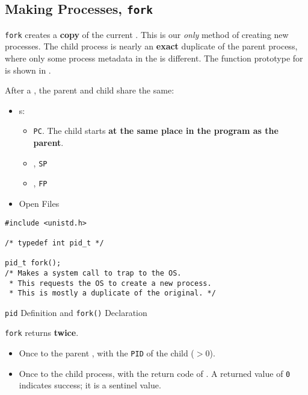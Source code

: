 \subsection{Making Processes, \texttt{fork}}\label{subsec:Making_Processes-fork}
\texttt{fork} creates a \textbf{copy} of the current .
This is our \textit{only} method of creating new processes.
The child process is nearly an \textbf{exact} duplicate of the parent process, where only some process metadata in the  is different.
The function prototype for  is shown in .

After a , the parent and child share the same:
\begin{itemize}[noitemsep]
\item {}s:
  \begin{itemize}[noitemsep]
  \item {} \texttt{PC}.
    The child starts \textbf{at the same place in the program as the parent}.
  \item {}, \texttt{SP}
  \item {}, \texttt{FP}
  \end{itemize}
\item Open Files
\end{itemize}

\begin{listing}[h!tbp]
\begin{verbatim}
#include <unistd.h>

/* typedef int pid_t */

pid_t fork();
/* Makes a system call to trap to the OS.
 * This requests the OS to create a new process.
 * This is mostly a duplicate of the original. */
\end{verbatim}
\caption{\texttt{pid} Definition and \texttt{fork()} Declaration}
\label{lst:PID_Definition_fork_Declaration}
\end{listing}

\texttt{fork} returns \textbf{twice}.
\begin{itemize}[noitemsep]
\item Once to the parent , with the \texttt{PID} of the child ($>0$).
\item Once to the child process, with the return code of .
  A returned value of \texttt{0} indicates success; it is a sentinel value.
\end{itemize}

